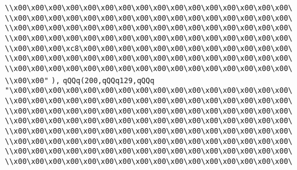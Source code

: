 \verb|\\x00\x00\x00\x00\x00\x00\x00\x00\x00\x00\x00\x00\x00\x00\x00\x00\|\newline
\verb|\\x00\x00\x00\x00\x00\x00\x00\x00\x00\x00\x00\x00\x00\x00\x00\x00\|\newline
\verb|\\x00\x00\x00\x00\x00\x00\x00\x00\x00\x00\x00\x00\x00\x00\x00\x00\|\newline
\verb|\\x00\x00\x00\x00\x00\x00\x00\x00\x00\x00\x00\x00\x00\x00\x00\x00\|\newline
\verb|\\x00\x00\x00\xc8\x00\x00\x00\x00\x00\x00\x00\x00\x00\x00\x00\x00\|\newline
\verb|\\x00\x00\x00\x00\x00\x00\x00\x00\x00\x00\x00\x00\x00\x00\x00\x00\|\newline
\verb|\\x00\x00\x00\x00\x00\x00\x00\x00\x00\x00\x00\x00\x00\x00\x00\x00\|\newline
\verb|\\x00\x00"|\newline
\verb|),|\newline
\verb|qQQq(200,qQQq129,qQQq|\newline
\verb|"\x00\x00\x00\x00\x00\x00\x00\x00\x00\x00\x00\x00\x00\x00\x00\x00\|\newline
\verb|\\x00\x00\x00\x00\x00\x00\x00\x00\x00\x00\x00\x00\x00\x00\x00\x00\|\newline
\verb|\\x00\x00\x00\x00\x00\x00\x00\x00\x00\x00\x00\x00\x00\x00\x00\x00\|\newline
\verb|\\x00\x00\x00\x00\x00\x00\x00\x00\x00\x00\x00\x00\x00\x00\x00\x00\|\newline
\verb|\\x00\x00\x00\x00\x00\x00\x00\x00\x00\x00\x00\x00\x00\x00\x00\x00\|\newline
\verb|\\x00\x00\x00\x00\x00\x00\x00\x00\x00\x00\x00\x00\x00\x00\x00\x00\|\newline
\verb|\\x00\x00\x00\x00\x00\x00\x00\x00\x00\x00\x00\x00\x00\x00\x00\x00\|\newline
\verb|\\x00\x00\x00\x00\x00\x00\x00\x00\x00\x00\x00\x00\x00\x00\x00\x00\|\newline
